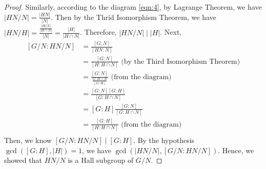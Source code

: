 \begin{answer}
\begin{proof}
        Similarly, according to the diagram \ref{eqn:4}, by Lagrange Theorem, we have $\lvert HN/N \rvert = \tfrac{\lvert HN \rvert}{\lvert N \rvert}$. Then by the Thrid Isomorphism Theorem, we have $\lvert HN/H \rvert = \tfrac{\frac{\lvert H \rvert \lvert N \rvert}{\lvert H \cap N \rvert}}{\lvert N \rvert} = \tfrac{\lvert H \rvert}{\lvert H \cap N \rvert}$. Therefore, $\lvert HN / N \rvert \mid \lvert H \rvert$. Next,
        \begin{equation}
            \begin{aligned}
                [G/N: HN/N] &= \tfrac{[G:N]}{[HN:N]}\\
                &= \tfrac{[G:N]}{[H:H\cap N]} \text{ (by the Third Isomorphism Theorem)}\\
                &= \tfrac{[G:N]}{\frac{G:H\cap N}{[G:H]}} \text{ (from the diagram)}\\
                &= \tfrac{[G:N][G:H]}{[G:H\cap N]}\\
                &= [G:H]\tfrac{[G:N]}{[G:H\cap N]}\\
                &= \tfrac{[G:H]}{[H:H\cap N]} \text{ (from the diagram)}\\
            \end{aligned}
        \end{equation}
        Then, we know $[G/N:HN/N] \mid [G:H]$. By the hypothesis $\gcd([G:H],\lvert H \rvert) = 1$, we have $\gcd(\lvert HN/N \rvert, [G/N:HN/N])$. Hence, we showed that $HN/N$ is a Hall subgroup of $G/N$.
    \end{proof}
\end{answer}
